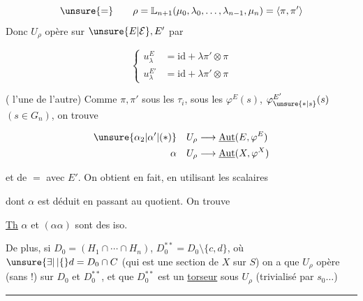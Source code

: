 \[
\unsure{=}\qquad \rho=\mathbb L_{n+1}(\mu_0,\lambda_0,\ldots,\lambda_{n-1},\mu_n)=\langle\pi,\pi'\rangle
\]
Donc $U_\rho$ opère  sur $\unsure{E|\mathcal E},E'$ par

\[
\left\{\begin{aligned}
u_\lambda^E &=\mathrm{id}+\lambda\pi'\otimes\pi\\
u_\lambda^{E'}&=\mathrm{id}+\lambda\pi'\otimes\pi
\end{aligned}\right.
\]

(  l'une de l'autre) Comme $\pi,\pi'$  sous les $\tau_i$,  sous les $\varphi^E(s)$, $\varphi_{\unsure{*|s}}^{E'}(s)$ $(s\in G_n)$, on trouve

\[
\begin{aligned}
\unsure{\alpha_2|\alpha'|(*)}\quad U_\rho&\longrightarrow\underline{\operatorname{Aut}}(E,\varphi^E)\\
\alpha\quad U_\rho&\longrightarrow\underline{\operatorname{Aut}}(X,\varphi^X)
\end{aligned}
\]

et de $=$ avec $E'$. On obtient en fait, en utilisant les scalaires


dont $\alpha$ est déduit en passant au quotient. On trouve

\uline{Th} $\alpha$ et $(\alpha\alpha)$ sont des iso.

De plus, si $D_0=(H_1\cap\cdots\cap H_n)$, $D_0^{**}=D_0\setminus\{c,d\}$, où $\unsure{\exists|\,|\{}d=D_0\cap C$ (qui est une section de $X$ sur $S$)  on a que
$U_\rho$ opère (sans !) sur $D_0$ et $D_0^{**}$, et que $D_0^{**}$ est un \uline{torseur} sous $U_\rho$\unsure{,} (trivialisé par $s_0\ldots$)

\begin{center}\rule{2.1cm}{0.35pt}\end{center}

